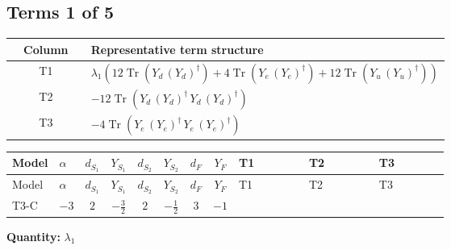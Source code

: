 \documentclass[8pt]{article}
\begin{document}
\begin{landscape}
\subsection*{Terms 1 of 5}
\begin{center}
\begin{tabular}{@{}c >{\raggedright\arraybackslash}p{0.82\linewidth}@{}}
\toprule
Column & Representative term structure \\
\midrule
T1 & \(\displaystyle {\lambda_1} (12 \operatorname{Tr}\!\left({Y_d}\,\left({Y_d}\right)^{\dagger}\right)+4 \operatorname{Tr}\!\left({Y_e}\,\left({Y_e}\right)^{\dagger}\right)+12 \operatorname{Tr}\!\left({Y_u}\,\left({Y_u}\right)^{\dagger}\right))\) \\
\midrule
T2 & \(\displaystyle -12 \operatorname{Tr}\!\left({Y_d}\,\left({Y_d}\right)^{\dagger}\,{Y_d}\,\left({Y_d}\right)^{\dagger}\right)\) \\
\midrule
T3 & \(\displaystyle -4 \operatorname{Tr}\!\left({Y_e}\,\left({Y_e}\right)^{\dagger}\,{Y_e}\,\left({Y_e}\right)^{\dagger}\right)\) \\
\midrule
\bottomrule
\end{tabular}
\end{center}
\smallskip
\tiny
\begin{longtable}{@{}llcccccc >{\raggedright\arraybackslash}p{0.21\linewidth} >{\raggedright\arraybackslash}p{0.21\linewidth} >{\raggedright\arraybackslash}p{0.21\linewidth}@{}}
\toprule
Model & $\alpha$ & $d_{S_1}$ & $Y_{S_1}$ & $d_{S_2}$ & $Y_{S_2}$ & $d_F$ & $Y_F$ & T1 & T2 & T3 \\
\midrule
\endfirsthead
\toprule
Model & $\alpha$ & $d_{S_1}$ & $Y_{S_1}$ & $d_{S_2}$ & $Y_{S_2}$ & $d_F$ & $Y_F$ & T1 & T2 & T3 \\
\midrule
\endhead
T3-C & $-3$ & $2$ & $-\frac{3}{2}$ & $2$ & $-\frac{1}{2}$ & $3$ & $-1$ & \scriptsize\adjustbox{max width=\linewidth}{$\begin{gathered} {\lambda_1} (12 \operatorname{Tr}\!\left({Y_d}\,\left({Y_d}\right)^{\dagger}\right)+4 \operatorname{Tr}\!\left({Y_e}\,\left({Y_e}\right)^{\dagger}\right)+12 \operatorname{Tr}\!\left({Y_u}\,\left({Y_u}\right)^{\dagger}\right))\end{gathered}$} & \scriptsize\adjustbox{max width=\linewidth}{$\begin{gathered} -12 \operatorname{Tr}\!\left({Y_d}\,\left({Y_d}\right)^{\dagger}\,{Y_d}\,\left({Y_d}\right)^{\dagger}\right)\end{gathered}$} & \scriptsize\adjustbox{max width=\linewidth}{$\begin{gathered} -4 \operatorname{Tr}\!\left({Y_e}\,\left({Y_e}\right)^{\dagger}\,{Y_e}\,\left({Y_e}\right)^{\dagger}\right)\end{gathered}$} \\
\midrule
\bottomrule
\end{longtable}
\clearpage
\noindent\textbf{Quantity: }$\lambda_1$\par\smallskip

\end{landscape}
\end{document}
